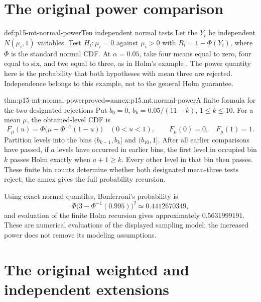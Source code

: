 \section{The original power comparison}
\label{sec:p15-mt-normal-power}

\begin{hbdefinition}{def:p15-mt-normal-power}{Ten independent normal tests}
Let the \(Y_i\) be independent \(N(\mu_i,1)\) variables. Test
\(H_i:\mu_i=0\) against \(\mu_i>0\) with
\(R_i=1-\Phi(Y_i)\), where \(\Phi\) is the standard normal CDF.
At \(\alpha=0.05\), take four means equal to zero, four equal to six,
and two equal to three, as in Holm's example
\cite[pp.~67--68]{Holm1979Original}.
The power quantity here is the probability that both hypotheses with
mean three are rejected. Independence belongs to this example, not to
the general Holm guarantee.
\end{hbdefinition}

\begin{hblemma}{thm:p15-mt-normal-power}{proved=annex:p15.mt.normal-power}{A finite formula for the two designated rejections}
Put \(b_0=0\), \(b_k=0.05/(11-k)\), \(1\leq k\leq10\).
For a mean \(\mu\), the obtained-level CDF is
\[
 F_\mu(u)=\Phi\bigl(\mu-\Phi^{-1}(1-u)\bigr)\quad(0<u<1),
 \qquad F_\mu(0)=0,\quad F_\mu(1)=1.
\]
Partition levels into the bins \((b_{k-1},b_k]\) and \((b_{10},1]\).
After all earlier comparisons have passed, if \(a\) levels have occurred
in earlier bins, the first level in occupied bin \(k\) passes Holm
exactly when \(a+1\geq k\).
Every other level in that bin then passes.
These finite bin counts determine whether both designated mean-three
tests reject; the annex gives the full probability recursion.

Using exact normal quantiles, Bonferroni's probability is
\[
 \Phi\bigl(3-\Phi^{-1}(0.995)\bigr)^2
                  \simeq0.4412670349,
\]
and evaluation of the finite Holm recursion gives approximately
\(0.5631999191\). These are numerical evaluations of the displayed
sampling model; the increased power does not remove its modeling assumptions.
\end{hblemma}

\section{The original weighted and independent extensions}
\label{sec:p15-mt-extensions}

